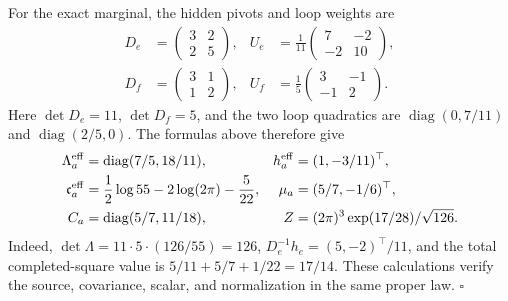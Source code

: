 For the exact marginal, the hidden pivots and loop weights are
\begin{equation}
\begin{aligned}
D_e&=\begin{pmatrix}3&2\\2&5\end{pmatrix},&
U_e&=\frac1{11}\begin{pmatrix}7&-2\\-2&10\end{pmatrix},\\
D_f&=\begin{pmatrix}3&1\\1&2\end{pmatrix},&
U_f&=\frac15\begin{pmatrix}3&-1\\-1&2\end{pmatrix}.
\end{aligned}
\label{eq:cg-nonflat-series-example-pivots}
\end{equation}
Here \(\det D_e=11\), \(\det D_f=5\), and the two loop
quadratics are
\(\operatorname{diag}(0,7/11)\) and
\(\operatorname{diag}(2/5,0)\).
The formulas above therefore give
\begin{equation}
\begin{aligned}
\Lambda_a^{\rm eff}&=\operatorname{diag}(7/5,18/11),&
h_a^{\rm eff}&=(1,-3/11)^\top,\\
\mathfrak c_a^{\rm eff}
 &=\frac12\log55-2\log(2\pi)-\frac5{22},&
\mu_a&=(5/7,-1/6)^\top,\\
C_a&=\operatorname{diag}(5/7,11/18),&
Z&=(2\pi)^3\exp(17/28)/\sqrt{126}.
\end{aligned}
\label{eq:cg-nonflat-series-example-law}
\end{equation}
Indeed, \(\det\Lambda=11\cdot5\cdot(126/55)=126\),
\(D_e^{-1}h_e=(5,-2)^\top/11\), and the total
completed-square value is
\(5/11+5/7+1/22=17/14\).
These calculations verify the source, covariance, scalar,
and normalization in the same proper law. \(\square\)

